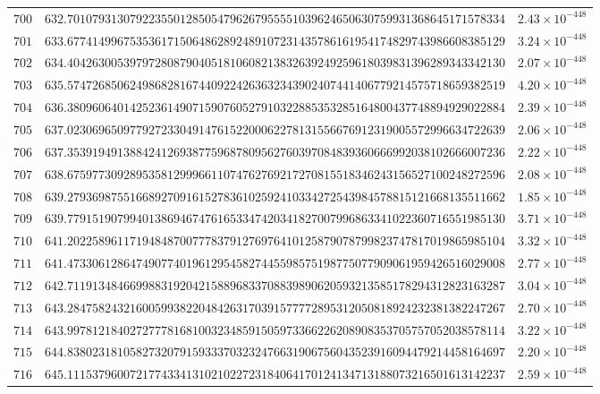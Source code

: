 \documentclass[12pt,reqno]{amsart}
\theoremstyle{remark}
\begin{document}
\begin{longtable}{clc}
$700$ & $632.7010793130792235501285054796267955551039624650630759931368645171578334$ & $2.43\times 10^{-448}$ \\
$701$ & $633.6774149967535361715064862892489107231435786161954174829743986608385129$ & $3.24\times 10^{-448}$ \\
$702$ & $634.4042630053979728087904051810608213832639249259618039831396289343342130$ & $2.07\times 10^{-448}$ \\
$703$ & $635.5747268506249868281674409224263632343902407441406779214575718659382519$ & $4.20\times 10^{-448}$ \\
$704$ & $636.3809606401425236149071590760527910322885353285164800437748894929022884$ & $2.39\times 10^{-448}$ \\
$705$ & $637.0230696509779272330491476152200062278131556676912319005572996634722639$ & $2.06\times 10^{-448}$ \\
$706$ & $637.3539194913884241269387759687809562760397084839360666992038102666007236$ & $2.22\times 10^{-448}$ \\
$707$ & $638.6759773092895358129996611074762769217270815518346243156527100248272596$ & $2.08\times 10^{-448}$ \\
$708$ & $639.2793698755166892709161527836102592410334272543984578815121668135511662$ & $1.85\times 10^{-448}$ \\
$709$ & $639.7791519079940138694674761653347420341827007996863341022360716551985130$ & $3.71\times 10^{-448}$ \\
$710$ & $641.2022589611719484870077783791276976410125879078799823747817019865985104$ & $3.32\times 10^{-448}$ \\
$711$ & $641.4733061286474907740196129545827445598575198775077909061959426516029008$ & $2.77\times 10^{-448}$ \\
$712$ & $642.7119134846699883192042158896833708839890620593213585178294312823163287$ & $3.04\times 10^{-448}$ \\
$713$ & $643.2847582432160059938220484263170391577772895312050818924232381382247267$ & $2.70\times 10^{-448}$ \\
$714$ & $643.9978121840272777816810032348591505973366226208908353705757052038578114$ & $3.22\times 10^{-448}$ \\
$715$ & $644.8380231810582732079159333703232476631906756043523916094479214458164697$ & $2.20\times 10^{-448}$ \\
$716$ & $645.1115379600721774334131021022723184064170124134713188073216501613142237$ & $2.59\times 10^{-448}$ \\

\end{longtable}
\end{document}
